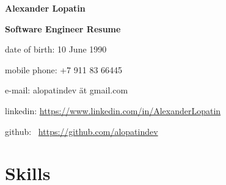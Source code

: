 \begin{center}
\fontsize{14pt}{10pt}\selectfont
\bfseries Alexander Lopatin\mdseries

\fontsize{10pt}{10pt}\selectfont
\bfseries Software Engineer\mdseries
\linebreak
Resume
\end{center}
{
\fontsize{9pt}{8pt}\selectfont
\begin{center}
\item date of birth: 10 June 1990
\item mobile phone: +7 911 83 66445
\item e-mail: alopatindev ät gmail.com
\item linkedin: \href{https://www.linkedin.com/in/AlexanderLopatin}{https://www.linkedin.com/in/AlexanderLopatin}
\item github: \
\href{https://github.com/alopatindev?tab=repositories}{https://github.com/alopatindev}
\end{center}
}


\fontsize{11pt}{12pt}\selectfont

\section{Skills}

